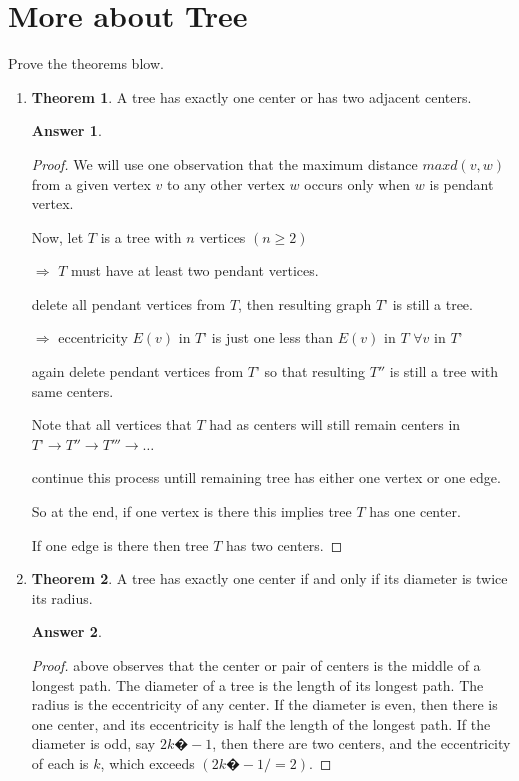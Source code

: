 \documentclass[a4paper]{article}
\renewcommand{\(}{\left(}
\renewcommand{\)}{\right)}
\theoremstyle{plain}
\theoremstyle{plain}
\theoremstyle{definition}
\newtheorem*{answer}{Answer}
\newtheorem{theorem}{Theorem}[section]
\begin{document}
\section{More about Tree}
Prove the theorems blow.
\begin{enumerate}[label=\Roman*]
  \item {
  \begin{theorem}
A tree has exactly one center or has two adjacent centers.
\end{theorem}
\begin{shaded}
\begin{answer}
\begin{proof}
We will use one observation that the maximum distance $max d(v,w)$ from a given vertex $v$ to any other vertex $w$ occurs only when $w$ is pendant vertex.

Now, let $T$ is a tree with $n$ vertices $(n \geq 2)$

$\Rightarrow$  $T$ must have at least two pendant vertices.

delete all pendant vertices from $T$, then resulting graph $T’$ is still a tree.

$\Rightarrow$ eccentricity $E(v)$ in $T’$ is just one less than $E(v)$ in $T$ $\forall v$ in $T’$

again delete pendant vertices from $T’$ so that resulting $T''$ is still a tree with same centers.

Note that all vertices that $T$ had as centers will still remain centers in $T’ \rightarrow T'' \rightarrow T''' \rightarrow \dots $

continue this process untill remaining tree has either one vertex or one edge.

So at the end, if one vertex is there this implies tree $T$ has one center.

If one edge is there then tree $T$ has two centers.
\end{proof}
\end{answer}
\end{shaded}
}

  \item {
  \begin{theorem}
A tree has exactly one center if and only if its diameter is twice its radius.
\end{theorem}
\begin{shaded}
\begin{answer}
\begin{proof}
  above observes that the center or pair of centers is the middle of a longest path. The diameter of a tree is the length of its longest path. The radius is the eccentricity of any center. If the diameter is even, then there is one center, and its eccentricity is half the length of the longest path. If the diameter is odd, say $2k �- 1$, then there are two centers, and the eccentricity of each is $k$, which exceeds $(2k �- 1/=2)$.
\end{proof}
\end{answer}
\end{shaded}
}
\end{enumerate}
\end{document}
